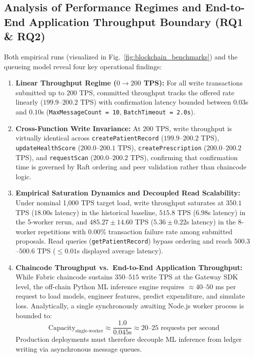 \documentclass[runningheads]{llncs}
\begin{document}
\subsection{Analysis of Performance Regimes and End-to-End Application Throughput Boundary (RQ1 \& RQ2)}
Both empirical runs (visualized in Fig.~\ref{fig:blockchain_benchmarks}) and the queueing model reveal four key operational findings:
\begin{enumerate}
    \item \textbf{Linear Throughput Regime ($0 \to 200$ TPS):} For all write transactions submitted up to $200$ TPS, committed throughput tracks the offered rate linearly ($199.9$--$200.2$ TPS) with confirmation latency bounded between $0.03$s and $0.10$s (\texttt{MaxMessageCount = 10}, \texttt{BatchTimeout = 2.0s}).
    \item \textbf{Cross-Function Write Invariance:} At $200$ TPS, write throughput is virtually identical across \texttt{createPatientRecord} ($199.9$--$200.2$ TPS), \texttt{updateHealthScore} ($200.0$--$200.1$ TPS), \texttt{createPrescription} ($200.0$--$200.2$ TPS), and \texttt{requestScan} ($200.0$--$200.2$ TPS), confirming that confirmation time is governed by Raft ordering and peer validation rather than chaincode logic.
    \item \textbf{Empirical Saturation Dynamics and Decoupled Read Scalability:} Under nominal 1,000 TPS target load, write throughput saturates at $350.1$ TPS ($18.00$s latency) in the historical baseline, $515.8$ TPS ($6.98$s latency) in the 5-worker rerun, and $485.27 \pm 14.60$ TPS ($5.36 \pm 0.22$s latency) in the 8-worker repetitions with $0.00\%$ transaction failure rate among submitted proposals. Read queries (\texttt{getPatientRecord}) bypass ordering and reach $500.3$--$500.6$ TPS ($\le 0.01$s displayed average latency).
    \item \textbf{Chaincode Throughput vs.\ End-to-End Application Throughput:} While Fabric chaincode sustains $350$--$515$ write TPS at the Gateway SDK level, the off-chain Python ML inference engine requires $\approx 40$--$50$ ms per request to load models, engineer features, predict expenditure, and simulate loss. Analytically, a single synchronously awaiting Node.js worker process is bounded to:
    \begin{equation}
    \text{Capacity}_{\text{single-worker}} \approx \frac{1.0}{0.045\text{s}} \approx 20\text{--}25\text{ requests per second}
    \end{equation}
    Production deployments must therefore decouple ML inference from ledger writing via asynchronous message queues.
\end{enumerate}
\end{document}
